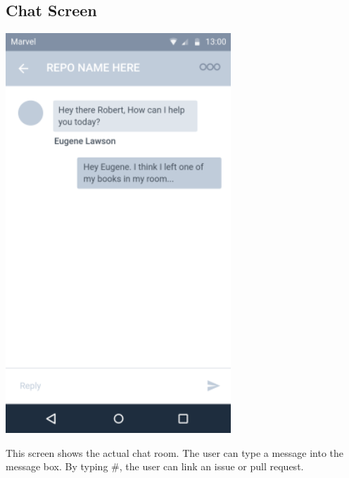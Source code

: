 \documentclass{report}
\begin{document}
\subsection{Chat Screen}
\begin{center}
    \includegraphics[scale=0.6]{design-chat}
\end{center}

This screen shows the actual chat room. The user can type a message into the message box. By typing \#, the user can link an issue or pull request.

\newpage
\end{document}
